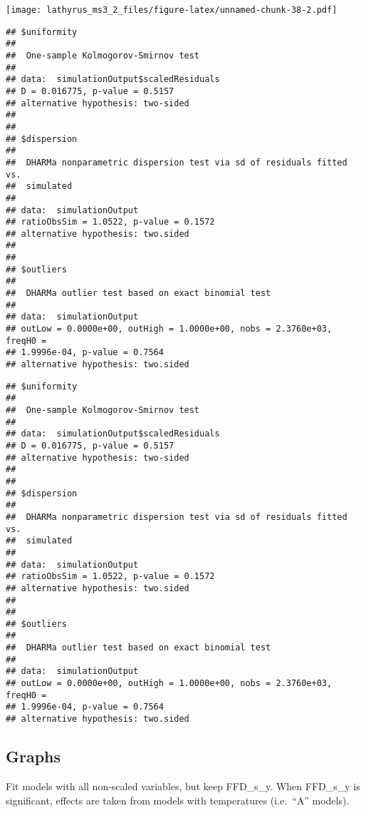\documentclass[
]{article}
\begin{document}
\texttt{[image: lathyrus\_ms3\_2\_files/figure-latex/unnamed-chunk-38-2.pdf]}

\begin{verbatim}
## $uniformity
## 
##  One-sample Kolmogorov-Smirnov test
## 
## data:  simulationOutput$scaledResiduals
## D = 0.016775, p-value = 0.5157
## alternative hypothesis: two-sided
## 
## 
## $dispersion
## 
##  DHARMa nonparametric dispersion test via sd of residuals fitted vs.
##  simulated
## 
## data:  simulationOutput
## ratioObsSim = 1.0522, p-value = 0.1572
## alternative hypothesis: two.sided
## 
## 
## $outliers
## 
##  DHARMa outlier test based on exact binomial test
## 
## data:  simulationOutput
## outLow = 0.0000e+00, outHigh = 1.0000e+00, nobs = 2.3760e+03, freqH0 =
## 1.9996e-04, p-value = 0.7564
## alternative hypothesis: two.sided
\end{verbatim}

\begin{verbatim}
## $uniformity
## 
##  One-sample Kolmogorov-Smirnov test
## 
## data:  simulationOutput$scaledResiduals
## D = 0.016775, p-value = 0.5157
## alternative hypothesis: two-sided
## 
## 
## $dispersion
## 
##  DHARMa nonparametric dispersion test via sd of residuals fitted vs.
##  simulated
## 
## data:  simulationOutput
## ratioObsSim = 1.0522, p-value = 0.1572
## alternative hypothesis: two.sided
## 
## 
## $outliers
## 
##  DHARMa outlier test based on exact binomial test
## 
## data:  simulationOutput
## outLow = 0.0000e+00, outHigh = 1.0000e+00, nobs = 2.3760e+03, freqH0 =
## 1.9996e-04, p-value = 0.7564
## alternative hypothesis: two.sided
\end{verbatim}

\hypertarget{graphs}{%
\subsection{Graphs}\label{graphs}}

Fit models with all non-scaled variables, but keep FFD\_s\_y. When
FFD\_s\_y is significant, effects are taken from models with
temperatures (i.e.~``A'' models).
\end{document}
